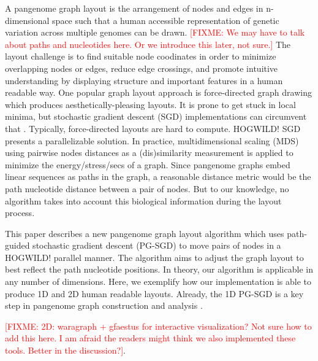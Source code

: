 \documentclass{bioinfo}
\theoremstyle{definition}
\newcommand{\red}[1]{{\textcolor{Red}{#1}}}
\newcommand{\FIXME}[1]{\red{[FIXME: #1]}}
\begin{document}
	A pangenome graph layout is the arrangement of nodes and edges in n-dimensional space such that a human accessible representation of genetic variation across multiple genomes can be drawn. 
	\FIXME{We may have to talk about paths and nucleotides here. Or we introduce this later, not sure.}
	The layout challenge is to find suitable node coodinates in order to minimize overlapping nodes or edges, reduce edge crossings, and promote intuitive understanding by displaying structure and important features in a human readable way. 
	One popular graph layout approach is force-directed graph drawing which produces aesthetically-pleasing layouts. It is prone to get stuck in local minima, but stochastic gradient descent (SGD) implementations can circumvent that \citep{Zheng2019}. Typically, force-directed layouts are hard to compute. HOGWILD! \citep{Recht2011} SGD presents a parallelizable solution. In practice, multidimensional scaling (MDS) using pairwise nodes distances as a (dis)similarity measurement is applied to minimize the energy/stress/secs of a graph.
	Since pangenome graphs embed linear sequences as paths in the graph, a reasonable distance metric would be the path nucleotide distance between a pair of nodes. 
	But to our knowledge, no algorithm takes into account this biological information during the layout process.
	
	This paper describes a new pangenome graph layout algorithm which uses path-guided stochastic gradient descent %
	(PG-SGD) to move pairs of nodes in a HOGWILD! parallel manner. The algorithm aims to adjust the graph layout to best reflect the path nucleotide positions. In theory, our algorithm is applicable in any number of dimensions. Here,
	we exemplify how our implementation is able to produce 1D and 2D human readable layouts. Already, the 1D PG-SGD is a key step in pangenome graph construction \citep{Liao2023, Garrison2023} and analysis \citep{Guarracino2022, Guarracino2023}.
	
	\FIXME{2D: waragraph + gfaestus for interactive visualization? Not sure how to add this here. I am afraid the readers might think we also implemented these tools. Better in the discussion?}. \\
	
	
\end{document}
